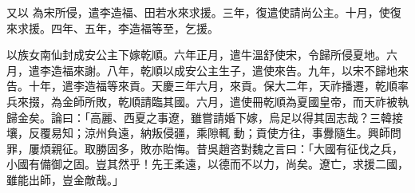 \begin{pinyinscope}
 又以
 為宋所侵，遣李造福、田若水來求援。三年，復遣使請尚公主。十月，使復來求援。四年、五年，李造福等至，乞援。



 以族女南仙封成安公主下嫁乾順。六年正月，遣牛溫舒使宋，令歸所侵夏地。六月，遣李造福來謝。八年，乾順以成安公主生子，遣使來告。九年，以宋不歸地來告。十年，遣李造福等來貢。天慶三年六月，來貢。保大二年，天祚播遷，乾順率兵來掇，為金師所敗，乾順請臨其國。六月，遣使冊乾順為夏國皇帝，而天祚被執歸金矣。論曰：「高麗、西夏之事遼，雖嘗請婚下嫁，烏足以得其固志哉？三韓接壤，反覆易知；涼州負遠，納叛侵疆，乘隙輒
 動；貢使方往，事釁隨生。興師問罪，屢煩親征。取勝固多，敗亦貽悔。昔吳趙咨對魏之言曰：「大國有征伐之兵，小國有備御之固。豈其然乎！先王柔遠，以德而不以力，尚矣。遼亡，求援二國，雖能出師，豈金敵哉。」



\end{pinyinscope}